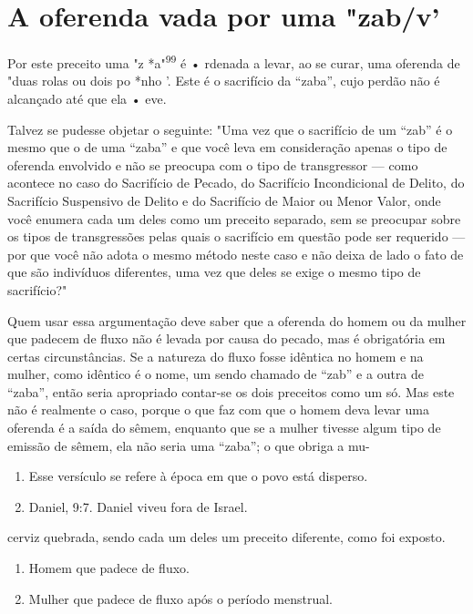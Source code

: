 \section{A oferenda vada por uma "zab/v'}

Por este preceito uma "z *a"\textsuperscript{99} é • rdenada a levar, ao
se curar, uma oferenda de "duas rolas ou dois po *nho '. Este é o
sacrifício da ``zaba'', cu­jo perdão não é alcançado até que ela • eve.

Talvez se pudesse objetar o seguinte: "Uma vez que o sacrifício de um
``zab'' é o mesmo que o de uma ``zaba'' e que você leva em consideração
apenas o tipo de oferenda envolvido e não se preocupa com o tipo de
trans­gressor --- como acontece no caso do Sacrifício de Pecado, do
Sacrifício Incon­dicional de Delito, do Sacrifício Suspensivo de Delito
e do Sacrifício de Maior ou Menor Valor, onde você enumera cada um deles
como um preceito separa­do, sem se preocupar sobre os tipos de
transgressões pelas quais o sacrifício em questão pode ser requerido ---
por que você não adota o mesmo método neste caso e não deixa de lado o
fato de que são indivíduos diferentes, uma vez que deles se exige o
mesmo tipo de sacrifício?"

Quem usar essa argumentação deve saber que a oferenda do homem ou da
mulher que padecem de fluxo não é levada por causa do pecado, mas é
obrigatória em certas circunstâncias. Se a natureza do fluxo fosse
idêntica no homem e na mulher, como idêntico é o nome, um sendo chamado
de ``zab'' e a outra de ``zaba'', então seria apropriado contar-se os dois
preceitos como um só. Mas este não é realmente o caso, porque o que faz
com que o homem deva levar uma oferenda é a saída do sêmem, enquanto que
se a mulher tivesse algum tipo de emissão de sêmem, ela não seria uma
``zaba''; o que obriga a mu-


\begin{enumerate}
\def\labelenumi{\arabic{enumi}.}
\setcounter{enumi}{95}
\item
 
 Esse versículo se refere à época em que o povo está disperso.
 
\item
 
 Daniel, 9:7. Daniel viveu fora de Israel.
 
\end{enumerate}


cerviz quebrada, sendo cada um deles um preceito diferente, como foi
exposto.


\begin{enumerate}
\def\labelenumi{\arabic{enumi}.}
\setcounter{enumi}{97}
\item
 
 Homem que padece de fluxo.
 
\item
 
 Mulher que padece de fluxo após o período menstrual.
 
\end{enumerate}





